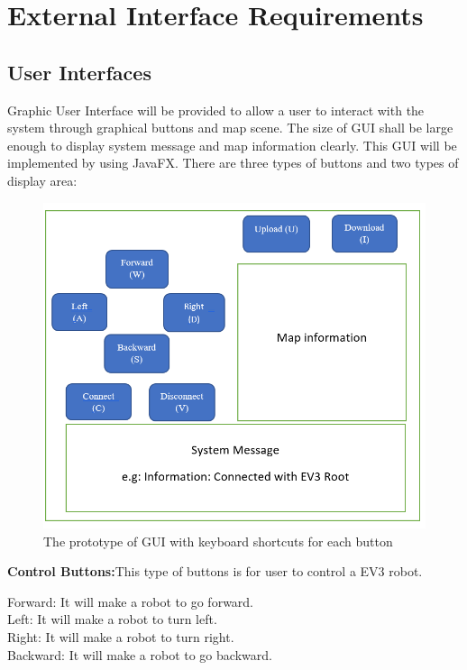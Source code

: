 \documentclass[10pt,a4paper,titlepage]{article}
\begin{document}
	\section{External Interface Requirements}
\subsection{User Interfaces}
Graphic User Interface will be provided to allow a user to interact with the system through graphical buttons and map scene. The size of GUI shall be large enough to display system message and map information clearly. This GUI will be implemented by using JavaFX. There are three types of buttons and two types of display area:\\

\begin{figure}[h]
	\includegraphics[width=\linewidth]{GUI.PNG}
	\caption{The prototype of GUI with keyboard shortcuts for each button}
	\label{fig:GUI with keyboard shortcuts}
\end{figure}

\textbf {Control Buttons:}This type of buttons is for user to control a EV3 robot.

Forward: It will make a robot to go forward.\\
Left: It will make a robot to turn left.\\
Right: It will make a robot to turn right.\\
Backward: It will make a robot to go backward.\\
\end{document}
